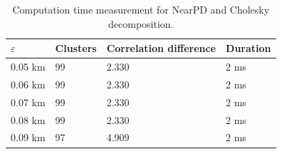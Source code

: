 \begin{table}[H]
    \centering
    \begin{tabular}{|l|l|l|l|}
        \hline
        $\varepsilon$ & Clusters & Correlation difference & Duration \\\hline
        0.05 km       & 99       & 2.330                  & 2 ms     \\\hline
        0.06 km       & 99       & 2.330                  & 2 ms     \\\hline
        0.07 km       & 99       & 2.330                  & 2 ms     \\\hline
        0.08 km       & 99       & 2.330                  & 2 ms     \\\hline
        0.09 km       & 97       & 4.909                  & 2 ms     \\\hline
    \end{tabular}
    \caption{Computation time measurement for NearPD and Cholesky decomposition.}
    \label{table:clusteringtime}
\end{table}

